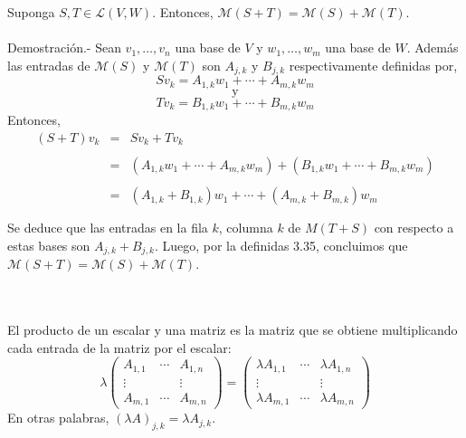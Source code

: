 \begin{myteo}\;\\\\
    Suponga $S,T\in \mathcal{L}(V,W)$. Entonces, $\mathcal{M}(S+T)=\mathcal{M}(S)+\mathcal{M}(T)$.\\\\
    Demostración.-\; Sean $v_1,\ldots, v_n$ una base de $V$ y $w_1,\ldots,w_m$ una base de $W$. Además las entradas de $\mathcal{M}(S)$ y $\mathcal{M}(T)$ son $A_{j,k}$ y $B_{j,k}$ respectivamente definidas por,
    $$Sv_k=A_{1,k}w_1+\cdots+A_{m,k}w_m$$
    $$\mbox{y}$$
    $$Tv_k=B_{1,k}w_1+\cdots+B_{m,k}w_m$$
    Entonces,
    $$
    \begin{array}{rcl}
	(S+T)v_k&=& Sv_k+Tv_k\\\\
		&=&\left(A_{1,k}w_1+\cdots +A_{m,k}w_m\right)+\left(B_{1,k}w_1+\cdots +B_{m,k}w_m\right)\\\\
		&=&\left(A_{1,k}+B_{1,k}\right)w_1+\cdots +\left(A_{m,k}+B_{m,k}\right)w_m\\\\
    \end{array}
    $$
    Se deduce que las entradas en la fila $k$, columna $k$ de $M(T+S)$ con respecto a estas bases son $A_{j,k}+B_{j,k}$. Luego, por la definidas 3.35, concluimos que $\mathcal{M}(S+T)=\mathcal{M}(S)+\mathcal{M}(T)$.
\end{myteo}

\begin{mydef}\;\\\\
    El producto de un escalar y una matriz es la matriz que se obtiene multiplicando cada entrada de la matriz por el escalar:
    $$
    \lambda
	\begin{pmatrix}
	    A_{1,1}&\cdots&A_{1,n}\\
	    \vdots&&\vdots\\
	    A_{m,1}&\cdots&A_{m,n}
	\end{pmatrix}
	=
	\begin{pmatrix}
	    \lambda A_{1,1}&\cdots&\lambda A_{1,n}\\
	    \vdots&&\vdots\\
	    \lambda A_{m,1}&\cdots&\lambda A_{m,n}
	\end{pmatrix}
    $$
    En otras palabras, $(\lambda A)_{j,k}=\lambda A_{j,k}$.
\end{mydef}

